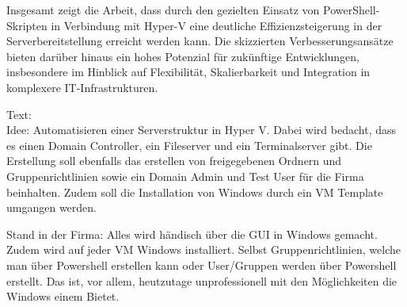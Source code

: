 \documentclass[conference]{IEEEtran}
\begin{document}
Insgesamt zeigt die Arbeit, dass durch den gezielten Einsatz von PowerShell-Skripten in Verbindung mit Hyper-V eine deutliche Effizienzsteigerung in der Serverbereitstellung erreicht werden kann.  
Die skizzierten Verbesserungsansätze bieten darüber hinaus ein hohes Potenzial für zukünftige Entwicklungen, insbesondere im Hinblick auf Flexibilität, Skalierbarkeit und Integration in komplexere IT-Infrastrukturen.

\newpage

Text:\\

Idee:
Automatisieren einer Serverstruktur in Hyper V. Dabei wird bedacht, dass es einen Domain Controller, ein Fileserver und ein Terminalserver gibt. Die Erstellung soll ebenfalls das erstellen von freigegebenen Ordnern und Gruppenrichtlinien sowie ein Domain Admin und Test User für die Firma beinhalten. Zudem soll die Installation von Windows durch ein VM Template umgangen werden.

Stand in der Firma:
Alles wird händisch über die GUI in Windows gemacht. Zudem wird auf jeder VM Windows installiert. Selbst Gruppenrichtlinien, welche man über Powershell erstellen kann oder User/Gruppen werden über Powershell erstellt. Das ist, vor allem, heutzutage unprofessionell mit den Möglichkeiten die Windows einem Bietet. 
\end{document}

